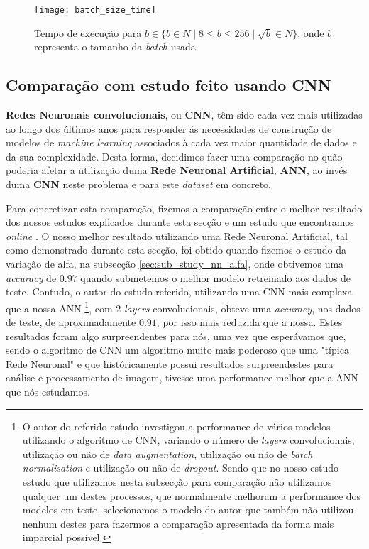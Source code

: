 \begin{figure}[!t]
\centering
\texttt{[image: batch\_size\_time]}
\caption{Tempo de execução para $b \in \{ b \in \!N \mid 8 \leq b \leq 256 \mid \sqrt{b} \in \!N \}$, onde $b$ representa o tamanho da \textit{batch} usada.}
\label{fig:batch_size_time}
\end{figure}

\subsection{Comparação com estudo feito usando CNN}             %
\textbf{Redes Neuronais convolucionais}, ou \textbf{CNN}, têm sido cada vez mais utilizadas ao longo dos últimos anos para responder ás necessidades de construção de modelos de \textit{machine learning} associados à cada vez maior quantidade de dados e da sua complexidade. Desta forma, decidimos fazer uma comparação no quão poderia afetar a utilização duma \textbf{Rede Neuronal Artificial}, \textbf{ANN}, ao invés duma \textbf{CNN} neste problema e para este \textit{dataset} em concreto. 

Para concretizar esta comparação, fizemos a comparação entre o melhor resultado dos nossos estudos explicados durante esta secção e um estudo que encontramos \textit{online} \cite{comparation_cnn}. O nosso melhor resultado utilizando uma Rede Neuronal Artificial, tal como demonstrado durante esta secção, foi obtido quando fizemos o estudo da variação de alfa, na subsecção \ref{sec:sub_study_nn_alfa}, onde obtivemos uma \textit{accuracy} de $0.97$ quando submetemos o melhor modelo retreinado aos dados de teste. Contudo, o autor do estudo referido, utilizando uma CNN mais complexa que a nossa ANN \footnote{O autor do referido estudo investigou a performance de vários modelos utilizando o algoritmo de CNN, variando o número de \textit{layers} convolucionais, utilização ou não de \textit{data augmentation}, utilização ou não de \textit{batch normalisation} e utilização ou não de \textit{dropout}. Sendo que no nosso estudo estudo que utilizamos nesta subsecção para comparação não utilizamos qualquer um destes processos, que normalmente melhoram a performance dos modelos em teste, selecionamos o modelo do autor que também não utilizou nenhum destes para fazermos a comparação apresentada da forma mais imparcial possível.}, com 2 \textit{layers} convolucionais, obteve uma \textit{accuracy}, nos dados de teste, de aproximadamente $0.91$, por isso mais reduzida que a nossa. 
Estes resultados foram algo surpreendentes para nós, uma vez que esperávamos que, sendo o algoritmo de CNN um algoritmo muito mais poderoso que uma "típica Rede Neuronal" e que históricamente possui resultados surpreendestes para análise e processamento de imagem, tivesse uma performance melhor que a ANN que nós estudamos.

